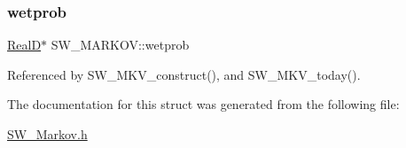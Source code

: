 \mbox{\label{struct_s_w___m_a_r_k_o_v_a0d300351fc442fd7cc9e99120cd24eb6}} 
\subsubsection{\texorpdfstring{wetprob}{wetprob}}
{\footnotesize\ttfamily \hyperlink{generic_8h_af1c105fd5732f70b91ddaeda0cc340e3}{RealD}$\ast$ S\+W\+\_\+\+M\+A\+R\+K\+O\+V\+::wetprob}



Referenced by S\+W\+\_\+\+M\+K\+V\+\_\+construct(), and S\+W\+\_\+\+M\+K\+V\+\_\+today().



The documentation for this struct was generated from the following file\+:\begin{DoxyCompactItemize}
\item 
\hyperlink{_s_w___markov_8h}{S\+W\+\_\+\+Markov.\+h}\end{DoxyCompactItemize}

